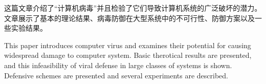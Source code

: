 \begin{cabstract}

这篇文章介绍了“计算机病毒”并且检验了它们导致计算机系统的广泛破坏的潜力。文章展示了基本的理论结果、病毒防御在大型系统中的不可行性、防御方案以及一些实验结果。

\end{cabstract}
\begin{eabstract}

This paper introduces computer virus and examines their potential 
for causing widespread damage to computer system. 
Basic therotical results are presented, 
and this infeasibility of viral defense 
in large classes of systems is shown. 
Defensive schemes are presented 
and several experiments are described. 



\end{eabstract}
